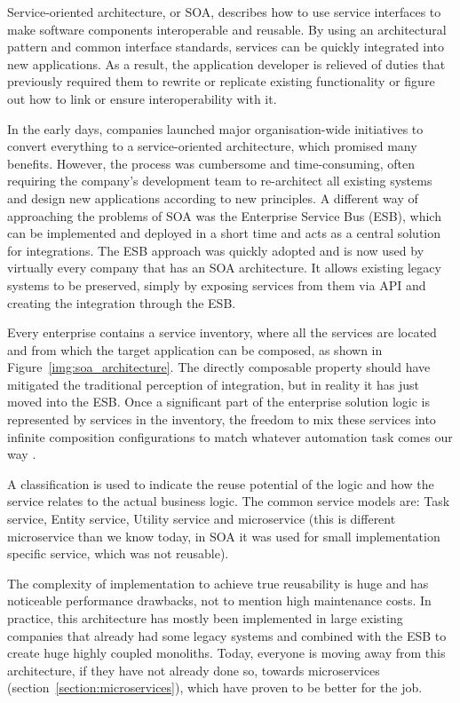 Service-oriented architecture, or SOA, describes how to use service interfaces to make software components interoperable and reusable. By using an architectural pattern and common interface standards, services can be quickly integrated into new applications. As a result, the application developer is relieved of duties that previously required them to rewrite or replicate existing functionality or figure out how to link or ensure interoperability with it. \cite{IBM_SOA}

In the early days, companies launched major organisation-wide initiatives to convert everything to a service-oriented architecture, which promised many benefits. However, the process was cumbersome and time-consuming, often requiring the company's development team to re-architect all existing systems and design new applications according to new principles. A different way of approaching the problems of SOA was the Enterprise Service Bus (ESB), which can be implemented and deployed in a short time and acts as a central solution for integrations. The ESB approach was quickly adopted and is now used by virtually every company that has an SOA architecture. It allows existing legacy systems to be preserved, simply by exposing services from them via API and creating the integration through the ESB.

Every enterprise contains a service inventory, where all the services are located and from which the target application can be composed, as shown in Figure~\ref{img:soa_architecture}. The directly composable property should have mitigated the traditional perception of integration, but in reality it has just moved into the ESB. Once a significant part of the enterprise solution logic is represented by services in the inventory, the freedom to mix these services into infinite composition configurations to match whatever automation task comes our way \cite{SERVICE_ORIENTED_ARCHITECTURE}.

A classification is used to indicate the reuse potential of the logic and how the service relates to the actual business logic. The common service models are: Task service, Entity service, Utility service and microservice (this is different microservice than we know today, in SOA it was used for small implementation specific service, which was not reusable). \cite{SERVICE_ORIENTED_ARCHITECTURE}

The complexity of implementation to achieve true reusability is huge and has noticeable performance drawbacks, not to mention high maintenance costs. In practice, this architecture has mostly been implemented in large existing companies that already had some legacy systems and combined with the ESB to create huge highly coupled monoliths. Today, everyone is moving away from this architecture, if they have not already done so, towards microservices (section~\ref{section:microservices}), which have proven to be better for the job.

